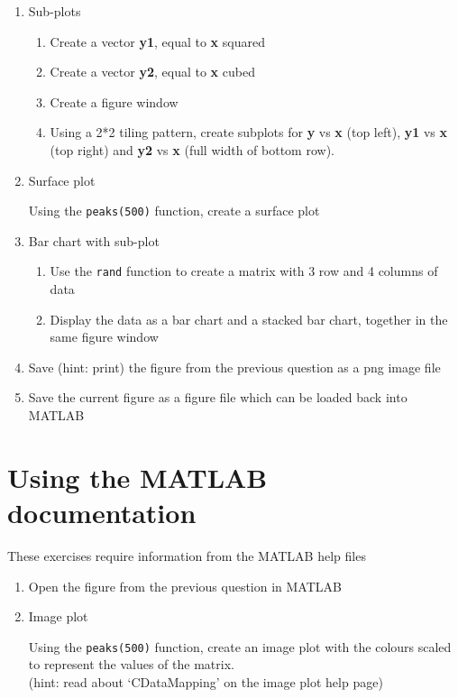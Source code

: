 \documentclass[a4paper]{article}
\begin{document}
\begin{enumerate}
	\pagebreak	
	
	\item Sub-plots
	\begin{enumerate}
		\item Create a vector \textbf{y1}, equal to \textbf{x} squared
		\item Create a vector \textbf{y2}, equal to \textbf{x} cubed
		\item Create a figure window
		\item Using a 2*2 tiling pattern, create subplots for \textbf{y} vs \textbf{x} (top left), \textbf{y1} vs \textbf{x} (top right) and \textbf{y2} vs \textbf{x} (full width of bottom row). 
	\end{enumerate}
	
	\item Surface plot
	
	Using the \texttt{peaks(500)} function, create a surface plot 

	\item Bar chart with sub-plot
	\begin{enumerate}
		\item Use the \texttt{rand} function to create a matrix with 3 row and 4 columns of data
		\item Display the data as a bar chart and a stacked bar chart, together in the 	same figure window
	\end{enumerate}
	
	\item Save (hint: print) the figure from the previous question as a png image file
	
	\item Save the current figure as a figure file which can be loaded back into MATLAB

	
\end{enumerate}

\medskip

\section{Using the MATLAB documentation}
{\large These exercises require information from the MATLAB help files}
	\begin{enumerate}
		\item Open the figure from the previous question in MATLAB
		
		\item Image plot
		
		Using the \texttt{peaks(500)} function, create an image plot with the colours scaled to represent the values of the matrix.\\
		(hint: read about `CDataMapping' on the image plot help page)	
	\end{enumerate}
\end{document}
